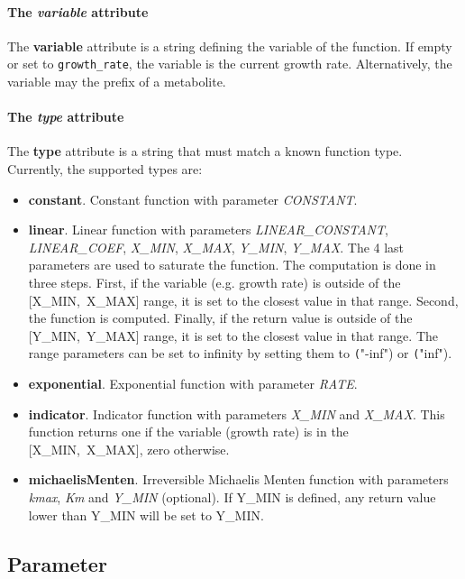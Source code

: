 \paragraph{The \textit{variable} attribute}
The \textbf{variable} attribute is a string defining the variable of the function.
If empty or set to \texttt{growth\_rate}, the variable is the current growth rate.
Alternatively, the variable may the prefix of a metabolite.

\paragraph{The \textit{type} attribute}
The \textbf{type} attribute is a string that must match a known function type.
Currently, the supported types are:
\begin{itemize}
  \item \textbf{constant}.
  Constant function with parameter
  \textit{CONSTANT}.
  \item \textbf{linear}.
  Linear function with parameters
  \textit{LINEAR\_CONSTANT}, \textit{LINEAR\_COEF},
  \textit{X\_MIN}, \textit{X\_MAX}, \textit{Y\_MIN}, \textit{Y\_MAX}.
  The 4 last parameters are used to saturate the function.
  The computation is done in three steps.
  First, if the variable (e.g. growth rate) is outside of the [X\_MIN,~X\_MAX] range,
  it is set to the closest value in that range.
  Second, the function is computed.
  Finally, if the return value is outside of the [Y\_MIN,~Y\_MAX] range,
  it is set to the closest value in that range.
  The range parameters can be set to infinity by setting them to
  \texttt("-inf") or \texttt("inf").
  \item \textbf{exponential}.
  Exponential function with parameter \textit{RATE}.
  \item \textbf{indicator}.
  Indicator function with parameters
  \textit{X\_MIN} and \textit{X\_MAX}.
  This function returns one if the variable (growth rate) is in the
  [X\_MIN,~X\_MAX], zero otherwise.
  \item \textbf{michaelisMenten}.
  Irreversible Michaelis Menten function with parameters
  \textit{kmax}, \textit{Km} and \textit{Y\_MIN} (optional).
  If Y\_MIN is defined, any return value lower than Y\_MIN will be set to
  Y\_MIN.\@
\end{itemize}


\subsection{Parameter}
\label{sec:parameter}

